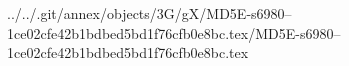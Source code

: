 ../../.git/annex/objects/3G/gX/MD5E-s6980--1ce02cfe42b1bdbed5bd1f76cfb0e8bc.tex/MD5E-s6980--1ce02cfe42b1bdbed5bd1f76cfb0e8bc.tex